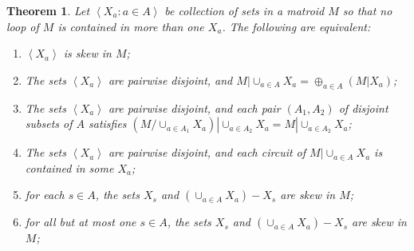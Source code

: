 \documentclass{amsart}
\theoremstyle{plain}
\newtheorem{theorem}{Theorem}[section]
\theoremstyle{definition}
\newcommand{\con}{/}
\newcommand{\ab}[1]{\left\langle#1\right\rangle}
\begin{document}
\begin{theorem}\label{skewequiv}
  Let $\ab{X_a : a \in A}$ be collection of sets in a matroid $M$ so that no loop of $M$ is contained in more than one $X_a$.
  The following are equivalent: 
  \begin{enumerate}[(1)]
    \item\label{seskew} $\ab{X_a}$ is skew in $M$;
    \item\label{sesum} The sets $\ab{X_a}$ are pairwise disjoint, and $M | \cup_{a \in A} X_a = \oplus_{a \in A} (M | X_a)$;
    \item\label{secon} 
      The sets $\ab{X_a}$ are pairwise disjoint, and each pair $(A_1, A_2)$ of 
      disjoint subsets of $A$ satisfies 
      $(M \con \cup_{a \in A_1} X_a) | \cup_{a \in A_2} X_a = M | \cup_{a \in A_2} X_a$;
    \item\label{secct} The sets $\ab{X_a}$ are pairwise disjoint, and each circuit of $M | \cup_{a \in A} X_a$ is contained in some $X_a$;
    \item\label{sesingle} for each $s \in A$, the sets $X_s$ and $(\cup_{a \in A}X_a) - X_s$ are skew in $M$;
    \item\label{sesinglebutone} for all but at most one $s \in A$, 
      the sets $X_s$ and $(\cup_{a \in A}X_a) - X_s$ are skew in $M$;
  \end{enumerate}
\end{theorem}
\end{document}
